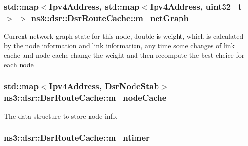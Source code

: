 \subsubsection[{\texorpdfstring{m\+\_\+net\+Graph}{m_netGraph}}]{\setlength{\rightskip}{0pt plus 5cm}std\+::map$<${\bf Ipv4\+Address}, std\+::map$<${\bf Ipv4\+Address}, uint32\+\_\+t$>$ $>$ ns3\+::dsr\+::\+Dsr\+Route\+Cache\+::m\+\_\+net\+Graph\hspace{0.3cm}{\ttfamily [private]}}\hypertarget{classns3_1_1dsr_1_1DsrRouteCache_a001b3261dc9f91bf3713b73c32206ee6}{}\label{classns3_1_1dsr_1_1DsrRouteCache_a001b3261dc9f91bf3713b73c32206ee6}
Current network graph state for this node, double is weight, which is calculated by the node information and link information, any time some changes of link cache and node cache change the weight and then recompute the best choice for each node 
\subsubsection[{\texorpdfstring{m\+\_\+node\+Cache}{m_nodeCache}}]{\setlength{\rightskip}{0pt plus 5cm}std\+::map$<${\bf Ipv4\+Address}, {\bf Dsr\+Node\+Stab}$>$ ns3\+::dsr\+::\+Dsr\+Route\+Cache\+::m\+\_\+node\+Cache\hspace{0.3cm}{\ttfamily [private]}}\hypertarget{classns3_1_1dsr_1_1DsrRouteCache_a2ad918da9614405b305be6c18ed04502}{}\label{classns3_1_1dsr_1_1DsrRouteCache_a2ad918da9614405b305be6c18ed04502}


The data structure to store node info. 

\subsubsection[{\texorpdfstring{m\+\_\+ntimer}{m_ntimer}}]{ ns3\+::dsr\+::\+Dsr\+Route\+Cache\+::m\+\_\+ntimer}\hypertarget{classns3_1_1dsr_1_1DsrRouteCache_adc0e73e78b967981ebb4fc79723517c2}{}\label{classns3_1_1dsr_1_1DsrRouteCache_adc0e73e78b967981ebb4fc79723517c2}


